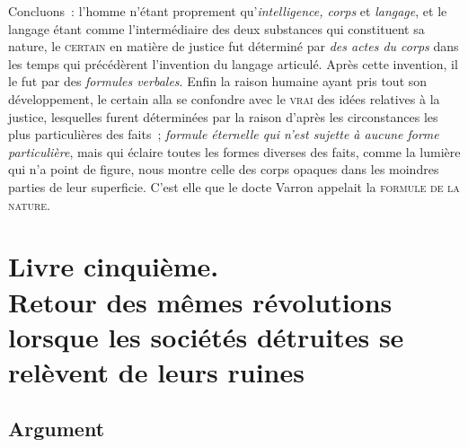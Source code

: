 \documentclass[french,twoside]{book} %
\newcommand\chapteropen{} %
\newcommand\chaptercont{} %
\newcommand\chapterclose{} %
\begin{document}
Concluons : l’homme n’étant proprement qu’{\itshape intelligence, corps} et {\itshape langage}, et le langage étant comme l’intermédiaire des deux substances qui constituent sa nature, le {\scshape certain} en matière de justice fut déterminé par {\itshape des actes du corps} dans les temps qui précédèrent l’invention du langage articulé. Après cette invention, il le fut par des {\itshape formules verbales}. Enfin la raison humaine ayant pris tout son développement, le certain alla se confondre avec le {\scshape vrai} des idées relatives à la justice, lesquelles furent déterminées par la raison d’après les circonstances les plus particulières des faits ;  {\itshape formule éternelle qui n’est sujette à aucune forme particulière}, mais qui éclaire toutes les formes diverses des faits, comme la lumière qui n’a point de figure, nous montre celle des corps opaques dans les moindres parties de leur superficie. C’est elle que le docte Varron appelait la {\scshape formule de la nature}.
\chapterclose

\chapterclose


\chapteropen
\part[{Livre cinquième. Retour des mêmes révolutions lorsque les sociétés détruites se relèvent de leurs ruines}]{Livre cinquième. \\
Retour des mêmes révolutions lorsque les sociétés détruites se relèvent de leurs ruines}

\chaptercont

\chapteropen
\chapter[{Argument}]{Argument}
\end{document}
